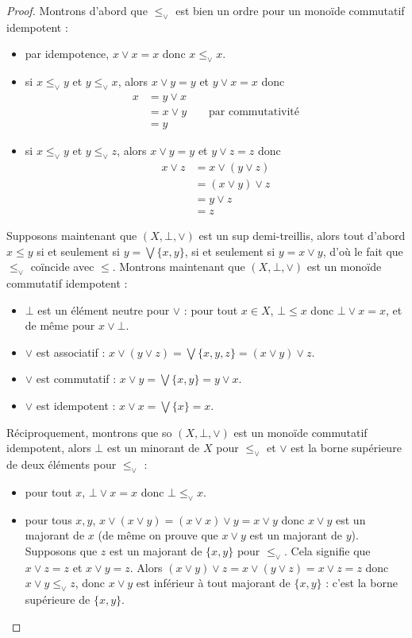 \begin{proof}
  Montrons d'abord que $\leq_\lor$ est bien un ordre pour un monoïde commutatif
  idempotent :
  \begin{itemize}
  \item par idempotence, $x\lor x = x$ donc $x\leq_\lor x$.
  \item si $x\leq_\lor y$ et $y\leq_\lor x$, alors $x\lor y = y$ et
    $y \lor x = x$
    donc
    \begin{align*}
      x &= y \lor x \\
      &= x \lor y \qquad\text{par commutativité}\\
      &= y
    \end{align*}
  \item si $x\leq_\lor y$ et $y\leq_\lor z$, alors $x\lor y = y$ et
    $y \lor z = z$
    donc
    \begin{align*}
      x\lor z &= x \lor (y \lor z) \\
      &= (x \lor y) \lor z \\
      &= y \lor z \\
      &= z
    \end{align*}
  \end{itemize}

  Supposons maintenant que $(X,\bot,\lor)$ est un sup demi-treillis, alors tout
  d'abord $x\leq y$ si et seulement si $y = \bigvee\{x,y\}$, si et seulement si
  $y = x \lor y$, d'où le fait que $\leq_\lor$ coïncide avec $\leq$. Montrons
  maintenant que $(X,\bot,\lor)$ est un monoïde commutatif idempotent :
  \begin{itemize}
  \item $\bot$ est un élément neutre pour $\lor$ : pour tout $x\in X$,
    $\bot\leq x$ donc $\bot \vee x = x$, et de même pour $x\vee\bot$.
  \item $\lor$ est associatif :
    $x\lor (y \lor z) = \bigvee\{x,y,z\} = (x\lor y)\lor z$.
  \item $\lor$ est commutatif : $x\lor y = \bigvee\{x,y\}=y\lor x$.
  \item $\lor$ est idempotent : $x\lor x = \bigvee\{x\}=x$.
  \end{itemize}

  Réciproquement, montrons que so $(X,\bot,\lor)$ est un monoïde commutatif
  idempotent, alors $\bot$ est un minorant de $X$ pour $\leq_\lor$ et $\lor$ est
  la borne supérieure de deux éléments pour $\leq_\lor$ :
  \begin{itemize}
  \item pour tout $x$, $\bot \lor x = x$ donc $\bot \leq_\lor x$.
  \item pour tous $x,y$, $x\lor (x\lor y) = (x\lor x)\lor y = x\lor y$ donc
    $x\lor y$ est un majorant de $x$ (de même on prouve que $x\lor y$ est un
    majorant de $y$). Supposons que $z$ est un majorant de $\{x,y\}$ pour
    $\leq_\lor$. Cela signifie que $x\lor z = z$ et $x\lor y = z$. Alors
    $(x\lor y)\lor z = x\lor (y\lor z) = x\lor z = z$ donc
    $x\lor y \leq_\lor z$, donc $x\lor y$ est inférieur à tout majorant de
    $\{x,y\}$ : c'est la borne supérieure de $\{x,y\}$.
  \end{itemize}
\end{proof}

